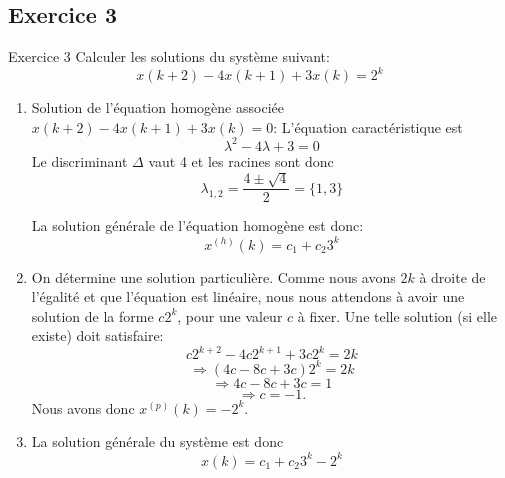          \subsection{Exercice 3}
            \begin{exercise}{Exercice 3}
                Calculer les solutions du système suivant:
                \begin{equation}
                    x(k+2)-4x(k+1)+3x(k) = 2^k
                \end{equation}
            \end{exercise}
            \begin{enumerate}
                \item Solution de l’équation homogène associée $x(k+2)-4x(k+1)+3x(k) = 0$:
                L’équation caractéristique est
                \begin{equation}
                    \lambda^2-4\lambda+3 = 0
                \end{equation}
                Le discriminant $\Delta$ vaut 4 et les racines sont donc
                \begin{equation}
                    \lambda_{1,2} = \frac{4 \pm \sqrt{4}}{2} = \{1,3\}
                \end{equation}


                La solution générale de l’équation homogène est donc:
                \begin{equation}
                    x^{(h)}(k) = c_1+c_2 3^k
                \end{equation}
                \item On détermine une solution particulière. Comme nous avons $2k$ à droite de l’égalité et que l’équation est linéaire, nous nous attendons à avoir une solution de la forme $c 2^k$, pour une valeur $c$ à fixer. Une telle solution (si elle existe) doit satisfaire:
                \begin{equation}
                    c 2^{k+2}-4c 2^{k+1}+3c 2^k = 2k
                \end{equation}
                \begin{equation}
                    \Rightarrow (4c-8c+3c)2^k = 2k
                \end{equation}
                \begin{equation}
                    \Rightarrow 4c-8c+3c = 1
                \end{equation}
                \begin{equation}
                    \Rightarrow c = -1.
                \end{equation}
                Nous avons donc $x^{(p)}(k) = -2^k$.
                \item La solution générale du système est donc
                \begin{equation}
                    x(k) = c_1+c_2 3^k-2^k
                \end{equation}
            \end{enumerate}
    

